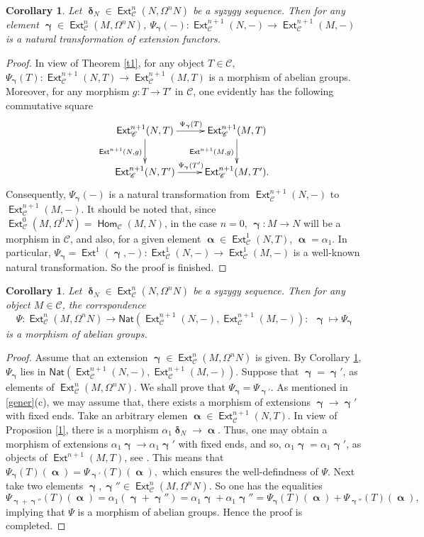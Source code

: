 \documentclass[11pt,a4paper]{amsart}
\newcommand{\rt}{\rightarrow}
\newcommand{\lrt}{\longrightarrow}
\newcommand{\C}{\mathscr{C} }
\def\Ext{\operatorname{{\mathsf{Ext}}}}
\def\hom{\operatorname{{\mathsf{Hom}}}}
\def\hom{\operatorname{\mathsf{Hom}}}
\def\syz{\mathsf{\Omega}}
\def\al{\operatorname{\boldsymbol{\alpha}}}
\def\ga{\operatorname{\boldsymbol{\gamma}}}
\def\de{\operatorname{\boldsymbol{\delta}}}
\newcommand{\nat}{{\mathsf{Nat}}}
\newtheorem{cor}[theorem]{Corollary}
\theoremstyle{definition}
\theoremstyle{plain}
\theoremstyle{definition}
\numberwithin{equation}{section}
\begin{document}
\begin{cor}\label{c2}Let  $\de_N\in\Ext^n_{\C}(N, \syz^nN)$  be a syzygy sequence. Then for any element $\ga\in\Ext^n_{\C}(M, \syz^nN)$, $\Psi_{\ga}(-):\Ext^{n+1}_{\C}(N, -)\lrt\Ext^{n+1}_{\C}(M, -)$ is a natural transformation of extension functors.
\end{cor}
\begin{proof}In view of Theorem \ref{t1}, for any object $T\in\C$, $\Psi_{\ga}(T):\Ext^{n+1}_{\C}(N, T)\lrt\Ext^{n+1}_{\C}(M, T)$ is a morphism of abelian groups. Moreover, for any morphism $g:T\rt T'$ in $\C$, one evidently has the following commutative square
\[\xymatrix{\Ext^{n+1}_{\C}(N, T)\ar[r]^{\Psi_{\ga}(T)}\ar[d]_{\Ext^{n+1}(N,g)}&\Ext^{n+1}_{\C}(M, T)\ar[d]_{\Ext^{n+1}(M, g)}\\ \Ext^{n+1}_{\C}(N, T')\ar[r]^{\Psi_{\ga}(T')}&\Ext^{n+1}_{\C}(M, T').}\]Consequently, $\Psi_{\ga}(-)$ is a natural transformation from  $\Ext^{n+1}_{\C}(N, -)$ to $\Ext^{n+1}_{\C}(M, -)$.
It should be noted that, since $\Ext^0_{\C}(M, \syz^0N)=\hom_{\C}(M, N)$, in the case $n=0$, $\ga:M\rt N$ will be a  morphism in $\C$, and also, for a given element  $\al\in\Ext^1_{\C}(N, T)$, $\al=\alpha_1$. In particular, $\Psi_{\ga}=\Ext^1(\ga, -):\Ext^{1}_{\C}(N, -)\lrt\Ext^{1}_{\C}(M, -)$ is a well-known natural transformation.
So the proof is finished.
\end{proof}

\begin{cor}\label{c3}Let $\de_N\in\Ext^n_{\C}(N, \syz^nN)$ be a syzygy sequence. Then for any object $M\in\C$, the corrspondence $$\Psi: \Ext^{n}_{\C}(M, \syz^nN)\lrt \nat(\Ext^{n+1}_{\C}(N, -), \Ext^{n+1}_{\C}(M, -)):~~\ga\mapsto \Psi_{\ga} $$ is a morphism of abelian groups.
\end{cor}
\begin{proof}
Assume that an extension $\ga\in\Ext^n_{\C}(M, \syz^nN)$ is given. By Corollary \ref{c2}, $\Psi_{\ga}$ lies in $\nat(\Ext^{n+1}_{\C}(N, -), \Ext^{n+1}_{\C}(M, -))$. Suppose that $\ga=\ga'$, as elements of $\Ext^n_{\C}(M, \syz^nN)$. We shall prove that $\Psi_{\ga}=\Psi_{\ga'}$. As mentioned in \ref{gener}(c), we may assume that, there exists a morphism of extensions $\ga\lrt\ga'$ with fixed ends. Take an arbitrary elemen $\al\in\Ext^{n+1}_{\C}(N, T)$. In view of Proposiion \ref{1}, there is a morphism $\alpha_1\de_N\lrt\al$. Thus, one may obtain a morphism of extensions $\alpha_1\ga\lrt\alpha_1\ga'$ with fixed ends, and so, $\alpha_1\ga=\alpha_1\ga'$, as objects of $\Ext^{n+1}(M, T)$, see \cite[Chapter VII, Proposition 3.1]{mit}. This means that $\Psi_{\ga}(T)(\al)=\Psi_{\ga'}(T)(\al),$ which  ensures the well-defindness of $\Psi$. Next take two elements $\ga, \ga''\in\Ext^n_{\C}(M, \syz^nN)$. So one has the equalities $$\Psi_{\ga+\ga''}(T)(\al)=\alpha_1(\ga+\ga'')=\alpha_1\ga+\alpha_1\ga''=\Psi_{\ga}(T)(\al)+\Psi_{\ga''}(T)(\al),$$ implying that $\Psi$ is a morphism of abelian groups. Hence the proof is completed.
\end{proof}
\end{document}
